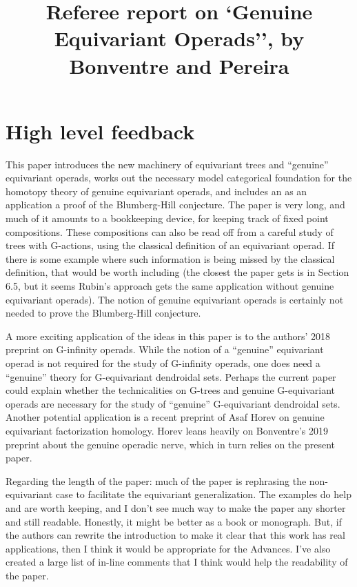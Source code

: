 \documentclass{article}
\begin{document}
 
 
\title{Referee report on `Genuine Equivariant Operads'', by Bonventre and Pereira
\\[12pt]} %
 

 
\maketitle

\section{High level feedback}

This paper introduces the new machinery of equivariant trees and ``genuine'' equivariant operads, works out the necessary model categorical foundation for the homotopy theory of genuine equivariant operads, and includes an as an application a proof of the Blumberg-Hill conjecture. The paper is very long, and much of it amounts to a bookkeeping device, for keeping track of fixed point compositions. These compositions can also be read off from a careful study of trees with G-actions, using the classical definition of an equivariant operad. If there is some example where such information is being missed by the classical definition, that would be worth including (the closest the paper gets is in Section 6.5, but it seems Rubin's approach gets the same application without genuine equivariant operads). The notion of genuine equivariant operads is certainly not needed to prove the Blumberg-Hill conjecture.

A more exciting application of the ideas in this paper is to the authors' 2018 preprint on G-infinity operads. While the notion of a ``genuine'' equivariant operad is not required for the study of G-infinity operads, one does need a ``genuine'' theory for G-equivariant dendroidal sets. Perhaps the current paper could explain whether the technicalities on G-trees and genuine G-equivariant operads are necessary for the study of ``genuine'' G-equivariant dendroidal sets. Another potential application is a recent preprint of Asaf Horev on genuine equivariant factorization homology. Horev leans heavily on Bonventre's 2019 preprint about the genuine operadic nerve, which in turn relies on the present paper.

Regarding the length of the paper: much of the paper is rephrasing the non-equivariant case to facilitate the equivariant generalization. The examples do help and are worth keeping, and I don't see much way to make the paper any shorter and still readable. Honestly, it might be better as a book or monograph. But, if the authors can rewrite the introduction to make it clear that this work has real applications, then I think it would be appropriate for the Advances. I've also created a large list of in-line comments that I think would help the readability of the paper.
\end{document}
